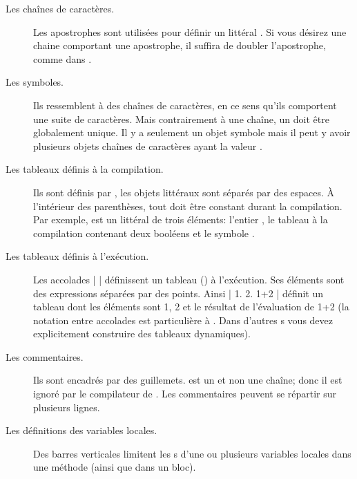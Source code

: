 \documentclass[a4paper,10pt,twoside]{book}
\begin{document}
\begin{description}
\item[Les chaînes de caract\`{e}res.] Les apostrophes sont utilis\'{e}es pour d\'{e}finir un  litt\'{e}ral .
Si vous d\'{e}sirez une chaine comportant une apostrophe, il suffira de doubler l'apostrophe, comme dans .

\item[Les symboles.] Ils ressemblent \`a des chaînes de caract\`{e}res, en ce sens qu'ils comportent une suite de caract\`{e}res.  
Mais contrairement \`{a} une chaîne, un  doit \^{e}tre globalement unique.
Il y a seulement un objet symbole  mais il peut y avoir plusieurs objets chaînes de caract\`{e}res ayant la valeur .

\item[Les tableaux définis \`{a} la compilation.] Ils sont d\'{e}finis par \ct{#( )}, les objets litt\'{e}raux sont s\'{e}par\'{e}s par des espaces.
À l'int\'{e}rieur des parenth\`{e}ses, tout doit \^{e}tre constant durant la compilation.
Par exemple,   est un
 litt\'{e}ral de trois \'{e}l\'{e}ments: l'entier , le tableau \`{a} la compilation contenant deux bool\'{e}ens et le symbole .

\item[Les tableaux définis \`{a} l'ex\'{e}cution.] Les accolades \ct|{ }|
  d\'{e}finissent un tableau () \`{a} l'ex\'{e}cution.
Ses \'{e}l\'{e}ments sont des expressions s\'epar\'{e}es par des points.
Ainsi \ct|{ 1. 2. 1+2 }| d\'{e}finit un tableau dont les \'{e}l\'{e}ments sont 1, 2 et le r\'{e}sultat de l'\'{e}valuation de 1+2
(la notation entre accolades est particuli\`{e}re \`{a} \sq.
Dans d'autres \st{}s vous devez explicitement construire des tableaux dynamiques).

\item[Les commentaires.] Ils sont encadr\'{e}s par des guillemets.
 est un  et non une
chaîne; donc il est ignor\'{e} par le compilateur de \sq.
Les commentaires peuvent se r\'{e}partir sur plusieurs lignes.
		
\item[Les d\'{e}finitions des variables locales.] Des barres
  verticales \ct{| |} limitent les
  s d'une ou plusieurs variables
  locales dans une m\'{e}thode (ainsi que dans un bloc).


\end{description}
\end{document}
